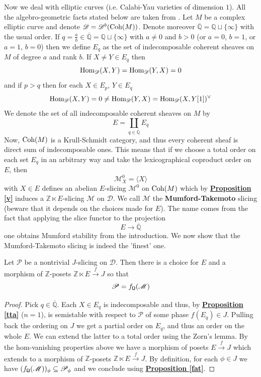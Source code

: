 Now we deal with elliptic curves (i.e. Calabi-Yau varieties of dimension $1$). All the algebro-geometric facts stated below are taken from \cite{ati}. Let $M$ be a complex elliptic curve and denote $\mathscr{D}=\mathscr{D}^b(\textnormal{Coh}(M))$. Denote moreover $\overline{\mathbb{Q}}=\mathbb{Q} \sqcup \{ \infty \}$ with the usual order. If $q=\frac{a}{b} \in \overline{\mathbb{Q}}=\mathbb{Q} \sqcup \{ \infty \}$ with $a \not = 0$ and $b>0$ (or $a=0$, $b=1$, or $a=1$, $b=0$) then we define $E_q$ as the set of indecomposable coherent sheaves on $M$ of degree $a$ and rank $b$. If $X \not = Y \in E_q$ then $$\textnormal{Hom}_{\mathscr{D}}(X,Y)=\textnormal{Hom}_{\mathscr{D}}(Y,X)=0$$
and if $p>q$ then for each $X \in E_p$, $Y \in E_q$ $$\textnormal{Hom}_{\mathscr{D}}(X,Y)=0 \not = \textnormal{Hom}_{\mathscr{D}}(Y,X)=\textnormal{Hom}_{\mathscr{D}}(X,Y[1])^{\vee}$$ We denote the set of all indecomposable coherent sheaves on $M$ by $$E=\coprod_{q \in \overline{\mathbb{Q}}} E_q$$ 
Now, $\textnormal{Coh}(M)$ is a Krull-Schmidt category, and thus every coherent sheaf is direct sum of indecomposable ones. This means that if we choose a total order on each set $E_q$ in an arbitrary way and take the lexicographical coproduct order on $E$, then $$\mathscr{M}_X^0= \langle X \rangle $$ 
with $X \in E$ defines an abelian $E$-slicing $\mathscr{M}^0$ on $\textnormal{Coh}(M)$ which by \hyperref[v]{\textbf{Proposition \ref*{v}}} induces a $\mathbb{Z} \ltimes E$-slicing $\mathscr{M}$ on $\mathscr{D}$. We call $\mathscr{M}$ the \textbf{Mumford-Takemoto} slicing (beware that it depends on the choices made for $E$). The name comes from the fact that applying the slice functor to the projection $$E \longrightarrow \overline{\mathbb{Q}}$$ one obtains Mumford stability from the introduction. We now show that the Mumford-Takemoto slicing is indeed the 'finest' one. 

\begin{prop}
Let $\mathscr{P}$ be a nontrivial $J$-slicing on $\mathscr{D}$. Then there is a choice for $E$ and a morphism of $\mathbb{Z}$-posets $\mathbb{Z} \ltimes E \overset{f}{\longrightarrow} J$ so that $$\mathscr{P}=f_{\textnormal{\Libra}}(\mathscr{M})$$
\end{prop}

\begin{proof}
Pick $q \in \overline{\mathbb{Q}}$. Each $X \in E_q$ is indecomposable and thus, by \hyperref[tta]{\textbf{Proposition \ref*{tta}}} ($n=1$), is semistable with respect to $\mathscr{P}$ of some phase $f(E_q) \in J$. Pulling back the ordering on $J$  we get a partial order on $E_q$, and thus an order on the whole $E$. We can extend the latter to a total order using the Zorn's lemma. By the hom-vanishing properties above we have a morphism of posets $E \overset{f}{\longrightarrow} J$ which extends to a morphism of $\mathbb{Z}$-posets $\mathbb{Z} \ltimes E \overset{f}{\longrightarrow} J$. By definition, for each $\phi \in J$ we have $(f_{\textnormal{\Libra}}(\mathscr{M}))_{\phi} \subseteq \mathscr{P}_{\phi}$ and we conclude using \hyperref[fat]{\textbf{Proposition \ref*{fat}}}.
\end{proof}

